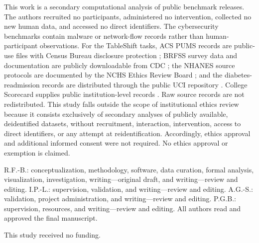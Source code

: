 \documentclass[referee,lineno,pdflatex,sn-nature]{sn-jnl}
\theoremstyle{thmstyleone}%
\theoremstyle{thmstyletwo}%
\theoremstyle{thmstylethree}%
\begin{document}
This work is a secondary computational analysis of public benchmark releases. The authors recruited no participants, administered no intervention, collected no new human data, and accessed no direct identifiers. The cybersecurity benchmarks contain malware or network-flow records rather than human-participant observations. For the TableShift tasks, ACS PUMS records are public-use files with Census Bureau disclosure protection \cite{uscensus2026pums}; BRFSS survey data and documentation are publicly downloadable from CDC \cite{cdc2022brfss}; the NHANES source protocols are documented by the NCHS Ethics Review Board \cite{cdc2026nhanesethics}; and the diabetes-readmission records are distributed through the public UCI repository \cite{uci2014diabetes}. College Scorecard supplies public institution-level records \cite{used2026scorecard}. Raw source records are not redistributed. This study falls outside the scope of institutional ethics review because it consists exclusively of secondary analyses of publicly available, deidentified datasets, without recruitment, interaction, intervention, access to direct identifiers, or any attempt at reidentification. Accordingly, ethics approval and additional informed consent were not required. No ethics approval or exemption is claimed.

R.F.-B.: conceptualization, methodology, software, data curation, formal analysis, visualization, investigation, writing---original draft, and writing---review and editing. I.P.-L.: supervision, validation, and writing---review and editing. A.G.-S.: validation, project administration, and writing---review and editing. P.G.B.: supervision, resources, and writing---review and editing. All authors read and approved the final manuscript.

This study received no funding.




\end{document}
